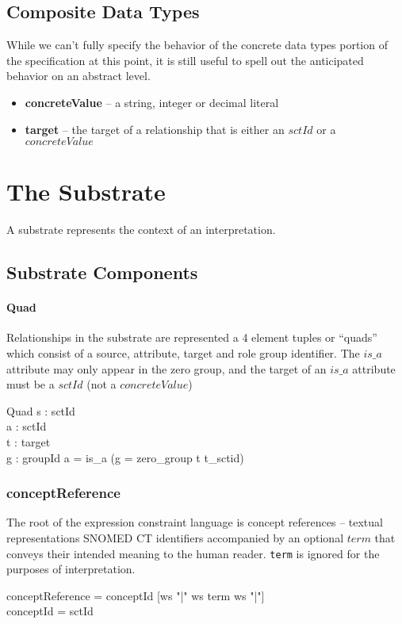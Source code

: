 \documentclass{article}
\def\spec#1{{\tt #1}}
\def\bnf#1{{\scriptsize {{#1}} }}
\begin{document}
\subsection{Composite Data Types}
While we can't fully specify the behavior of the concrete data types portion of the specification at this point, it is still useful 
to spell out the anticipated behavior on an abstract level.
\begin{itemize}[noitemsep,nolistsep]
\item \textbf{concreteValue} -- a string, integer or decimal literal
\item \textbf{target} -- the target of a relationship that is either an $sctId$ or a $concreteValue$
\end{itemize}

\section{The Substrate}
A substrate represents the context of an interpretation.  
\subsection{Substrate Components}
\paragraph{Quad}
Relationships in the substrate are represented a 4 element tuples or ``quads'' which consist of a source, attribute, target and role group identifier.  The $is\_a$ attribute may
only appear in the zero group, and the target of an $is\_a$ attribute must be a $sctId$ (not a $concreteValue$)

\begin{schema}{Quad}
   s : sctId \\
   a : sctId \\
   t : target \\
   g : groupId
\where
   a = is\_a \implies (g = zero\_group \land t \in \ran t\_sctid)
\end{schema}

\subsubsection{conceptReference}
The root of the expression constraint language is concept references -- textual representations SNOMED CT identifiers accompanied by an optional $term$ that conveys their
intended meaning to the human reader.  \spec{term} is ignored for the purposes of interpretation.  
\begin{framed}
\noindent
\bnf{conceptReference = conceptId [ws "|" ws term ws "|"]} \\
\bnf{conceptId = sctId}
\end{framed}
\end{document}
